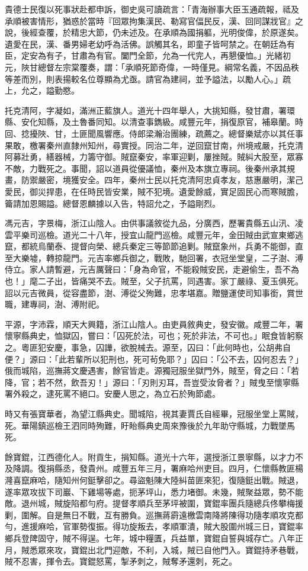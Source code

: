 \begin{pinyinscope}
貴德士民復以死事狀赴都申訴，御史吳可讀疏言：「青海辦事大臣玉通疏報，祗及承順被害情形，猶惑於當時『回眾拘集漢民、勒寫官偪民反，漢、回同謀戕官』之說，後經查覆，於精忠大節，仍未述及。在承順為國捐軀，光明俊偉，於原遂矣。遺愛在民，漢、番男婦老幼呼為活佛。誤觸其名，即童子皆呵禁之。在朝廷為有臣，定安為有子，甘肅為有官。闔門全節，允為一代完人，再懇優恤。」光緒初元，陜甘總督左宗棠覆奏，謂：「承順死節奇偉，一時僅見。綱常名義，不因品秩等差而別，則表揚較名位尊顯為尤亟。請官為建祠，並予謚法，以勵人心。」疏上，允之，謚勤愍。

托克清阿，字凝如，滿洲正藍旗人。道光十四年舉人，大挑知縣，發甘肅，署環縣、安化知縣，及土魯番同知。以清查事鐫級。咸豐元年，捐復原官，補皋蘭。時回、捻擾陜、甘，土匪聞風響應。侍郎梁瀚治團練，疏薦之。總督樂斌亦以其任事果敢，檄署秦州直隸州知州，尋實授。同治二年，逆回竄甘南，州境戒嚴，托克清阿募壯勇，繕器械，力籌守御。賊竄秦安，率軍迎剿，屢挫賊。賊糾大股至，眾寡不敵，力戰死之。事聞，詔以道員從優議恤，秦州及本旗立專祠。後秦州承其規畫，防禦嚴密，境獲安全。四年，秦州士民以托克清阿忠貞孝友，慈惠嚴明，潔己愛民，御災捍患，在任時民皆安業，賊不犯境。遺愛餘威，實足固民心而寒賊膽，籥請加恩賜謚。總督恩麟據以入告，特詔允之，予謚剛烈。

馮元吉，字景梅，浙江山陰人。由供事議敘從九品，分廣西，歷署貴縣五山汛、凌雲平樂司巡檢。道光二十八年，授宜山龍門巡檢。咸豐元年，金田賊由武宣東鄉逃竄，都統烏蘭泰、提督向榮、總兵秦定三等節節追剿。賊竄象州，兵勇不能御，直至大樂墟，轉掠龍門。元吉率鄉兵御之，戰敗，馳回署，衣冠坐堂皇，二子澍、溥侍立。家人請暫避，元吉厲聲曰：「身為命官，不能殺賊安民，走避偷生，吾不為也！」麾二子出，皆痛哭不去。賊至，父子抗罵，同遇害。家丁嚴祿、夏玉俱死。詔以元吉微員，從容盡節，澍、溥從父殉難，忠孝堪嘉。贈鹽運使司知事銜，賞世職，建專祠，澍、溥附祀。

平源，字沛霖，順天大興籍，浙江山陰人。由吏員敘典史，發安徽。咸豐二年，署懷寧縣典史，恤獄囚，嘗曰：「囚死於法，可也；死於非法，不可也。」眠食皆躬察之。粵匪犯安慶，事急，囚譁，欲脫械去。源至，囚曰：「此何時也，公胡弗自便？」源曰：「此若輩所以犯刑也，死可茍免耶？」囚曰：「公不去，囚何忍去？」俄而城陷，巡撫蔣文慶遇害，餘官皆走。源獨冠服坐獄門外，賊至，脅之曰：「若降，官；若不然，飲吾刃！」源曰：「刃則刃耳，吾豈受汝脅者？」賊曳至懷寧縣署外殺之，逮死罵不絕口。安慶人思之，為立石於殉節處。

時又有張寶華者，為望江縣典史。聞城陷，視其妻賈氏自經畢，冠服坐堂上罵賊，死。華陽鎮巡檢王泗同時殉難，盱眙縣典史周來豫後於九年助守縣城，力戰墜馬死。

餘寶錕，江西德化人。附貢生，捐知縣。道光十六年，選授浙江景寧縣，以才力不及降調。復捐縣丞，發貴州。咸豐五年三月，署麻哈州吏目。四月，仁懷縣教匪楊漋喜竄麻哈，隨知州何鋌擊卻之。尋盜魁陳大陸糾苗匪來犯，復隨鋌出戰。賊退，遂率眾攻拔下司巖、下雞場等處，扼茅坪山，悉力堵御。未幾，賊聚益眾，勢不能敵。退州城，賊旋陷都勻府。提督孝順兵至茅坪被圍，寶錕率團兵隨總兵佟攀梅援剿，圍解。自是無日不戰，互有勝負。巡撫蔣霨遠檄雲南降將陳得功隨孝順攻克都勻，進援麻哈，官軍勢復振。得功旋叛去，孝順軍潰，賊大股圍州城三日，寶錕率鄉兵登陴固守，賊不得逞。七年，城中糧匱，兵益單，寶錕自誓與城存亡。八年正月，賊悉眾來攻，寶錕出北門迎敵，不利，入城，賊已自他門入。寶錕持矛巷戰，賊不忍害，揮令去。寶錕怒罵，掣矛刺之，賊奪矛還刺，死之。


\end{pinyinscope}
